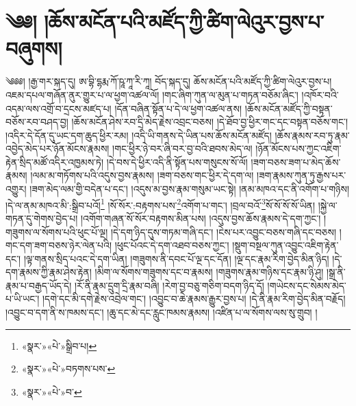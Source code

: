 \chapter{༄༅། །ཆོས་མངོན་པའི་མཛོད་ཀྱི་ཚིག་ལེའུར་བྱས་པ་བཞུགས། }༄༅༅། །རྒྱ་གར་སྐད་དུ། ཨ་བྷི་དྷརྨ་ཀོ་ཥཱ་ཀཱ་རི་ཀཱ། བོད་སྐད་དུ། ཆོས་མངོན་པའི་མཛོད་ཀྱི་ཚིག་ལེའུར་བྱས་པ། འཇམ་དཔལ་གཞོན་ནུར་གྱུར་པ་ལ་ཕྱག་འཚལ་ལོ། །གང་ཞིག་ཀུན་ལ་མུན་པ་གཏན་བཅོམ་ཞིང་། །འཁོར་བའི་འདམ་ལས་འགྲོ་བ་དྲངས་མཛད་པ། །དོན་བཞིན་སྟོན་པ་དེ་ལ་ཕྱག་འཚལ་ནས། །ཆོས་མངོན་མཛོད་ཀྱི་བསྟན་བཅོས་རབ་བཤད་བྱ། །ཆོས་མངོན་ཤེས་རབ་དྲི་མེད་རྗེས་འབྲང་བཅས། །དེ་ཐོབ་བྱ་ཕྱིར་གང་དང་བསྟན་བཅོས་གང་། །འདིར་དེ་དོན་དུ་ཡང་དག་ཆུད་ཕྱིར་རམ། །འདི་ཡི་གནས་དེ་ཡིན་པས་ཆོས་མངོན་མཛོད། །ཆོས་རྣམས་རབ་ཏུ་རྣམ་འབྱེད་མེད་པར་ཉོན་མོངས་རྣམས། །གང་ཕྱིར་ཉེ་བར་ཞི་བར་བྱ་བའི་ཐབས་མེད་ལ། །ཉོན་མོངས་པས་ཀྱང་འཇིག་རྟེན་སྲིད་མཚོ་འདིར་འཁྱམས་ཏེ། །དེ་བས་དེ་ཕྱིར་འདི་ནི་སྟོན་པས་གསུངས་སོ་ལོ། །ཟག་བཅས་ཟག་པ་མེད་ཆོས་རྣམས། །ལམ་མ་གཏོགས་པའི་འདུས་བྱས་རྣམས། །ཟག་བཅས་གང་ཕྱིར་དེ་དག་ལ། །ཟག་རྣམས་ཀུན་ཏུ་རྒྱས་པར་འགྱུར། །ཟག་མེད་ལམ་གྱི་བདེན་པ་དང་། །འདུས་མ་བྱས་རྣམ་གསུམ་ཡང་སྟེ། །ནམ་མཁའ་དང་ནི་འགོག་པ་གཉིས། །དེ་ལ་ནམ་མཁའ་མི་:སྒྲིབ་པའོ།\footnote{«སྣར་»«པེ་»སྒྲིབ་པ།} །སོ་སོར་:བརྟགས་པས་\footnote{«སྣར་»«པེ་»བཏགས་པས་}འགོག་པ་གང་། །བྲལ་བའོ་\footnote{«སྣར་»«པེ་»བ་}སོ་སོ་སོ་སོ་ཡིན། །སྐྱེ་ལ་གཏན་དུ་གེགས་བྱེད་པ། །འགོག་གཞན་སོ་སོར་བརྟགས་མིན་པས། །འདུས་བྱས་ཆོས་རྣམས་དེ་དག་ཀྱང་། །གཟུགས་ལ་སོགས་པའི་ཕུང་པོ་ལྔ། །དེ་དག་ཉིད་དུས་གཏམ་གཞི་དང་། །ངེས་པར་འབྱུང་བཅས་གཞི་དང་བཅས། །གང་དག་ཟག་བཅས་ཉེར་ལེན་པའི། །ཕུང་པོའང་དེ་དག་འཐབ་བཅས་ཀྱང་། །སྡུག་བསྔལ་ཀུན་འབྱུང་འཇིག་རྟེན་དང་། །ལྟ་གནས་སྲིད་པའང་དེ་དག་ཡིན། །གཟུགས་ནི་དབང་པོ་ལྔ་དང་དོན། །ལྔ་དང་རྣམ་རིག་བྱེད་མིན་ཉིད། །དེ་དག་རྣམས་ཀྱི་རྣམ་ཤེས་རྟེན། །མིག་ལ་སོགས་གཟུགས་དང་བ་རྣམས། །གཟུགས་རྣམ་གཉིས་དང་རྣམ་ཉི་ཤུ། །སྒྲ་ནི་རྣམ་པ་བརྒྱད་ཡོད་དེ། །རོ་ནི་རྣམ་དྲུག་དྲི་རྣམ་བཞི། །རེག་བྱ་བཅུ་གཅིག་བདག་ཉིད་དོ། །གཡེངས་དང་སེམས་མེད་པ་ཡི་ཡང་། །དགེ་དང་མི་དགེ་རྗེས་འབྲེལ་གང་། །འབྱུང་བ་ཆེ་རྣམས་རྒྱུར་བྱས་པ། །དེ་ནི་རྣམ་རིག་བྱེད་མིན་བརྗོད། །འབྱུང་བ་དག་ནི་ས་ཁམས་དང་། །ཆུ་དང་མེ་དང་རླུང་ཁམས་རྣམས། །འཛིན་པ་ལ་སོགས་ལས་སུ་གྲུབ། །
